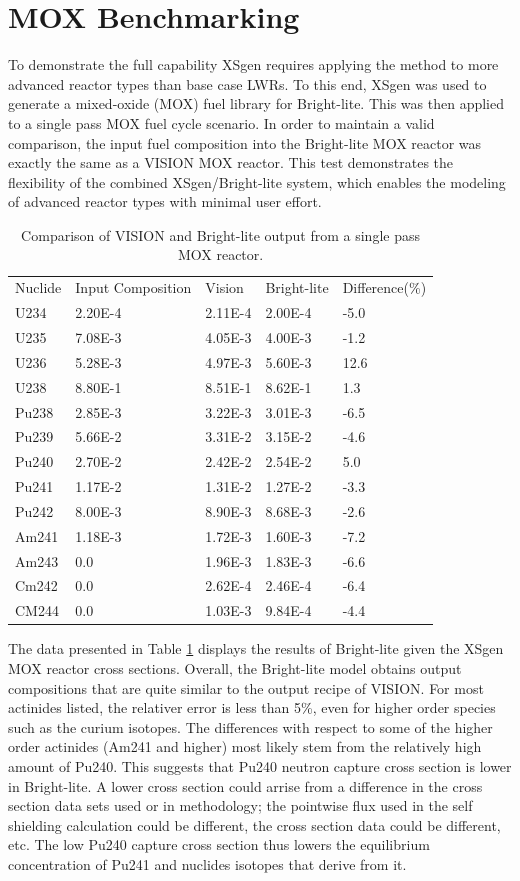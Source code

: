 \documentclass{article}
\begin{document}
\section{MOX Benchmarking}
\label{sec-mox-benchmark}
To demonstrate the full capability XSgen requires applying the method to more advanced
reactor types than base case LWRs. To this end, XSgen was used to generate a mixed-oxide (MOX)
fuel library for Bright-lite. This was then applied to a single pass MOX fuel cycle scenario.
In order to maintain a valid comparison, the input fuel composition into the Bright-lite MOX
reactor was exactly the same as a VISION MOX reactor.
This test demonstrates the flexibility of the combined XSgen/Bright-lite system, which enables
the modeling of advanced reactor types with minimal user effort.

\begin{table}[!htb]
\centering
\caption{Comparison of VISION and Bright-lite output from a single pass MOX reactor.}
\label{tab:g}
\begin{tabular}{lllll}
Nuclide & Input Composition & Vision & Bright-lite & Difference(\%) \\
U234 & 2.20E-4 & 2.11E-4 & 2.00E-4 & -5.0\\
U235 & 7.08E-3 & 4.05E-3 & 4.00E-3 & -1.2\\
U236 & 5.28E-3 & 4.97E-3 & 5.60E-3 & 12.6\\
U238 & 8.80E-1 & 8.51E-1 & 8.62E-1 & 1.3\\
Pu238 & 2.85E-3 & 3.22E-3 & 3.01E-3 & -6.5\\
Pu239 & 5.66E-2 & 3.31E-2 & 3.15E-2 & -4.6\\
Pu240 & 2.70E-2 & 2.42E-2 & 2.54E-2 & 5.0\\
Pu241 & 1.17E-2 & 1.31E-2 & 1.27E-2 & -3.3\\
Pu242 & 8.00E-3 & 8.90E-3 & 8.68E-3 & -2.6\\
Am241 & 1.18E-3 & 1.72E-3 & 1.60E-3 & -7.2\\
Am243 & 0.0 & 1.96E-3 & 1.83E-3 & -6.6\\
Cm242 & 0.0 & 2.62E-4 & 2.46E-4 & -6.4\\
CM244 & 0.0 & 1.03E-3 & 9.84E-4 & -4.4
\end{tabular}
\end{table}

The data presented in Table \ref{tab:g} displays the results of Bright-lite given the XSgen MOX
reactor cross sections. Overall, the Bright-lite model obtains output compositions that
are quite similar to the output recipe of VISION. For most actinides listed, the relativer error
is less than 5\%, even for higher order species such as the curium isotopes.
The differences with respect to some of the higher order actinides (Am241 and higher) most
likely stem from the relatively high amount of Pu240. This suggests that Pu240 neutron capture
cross section is lower in Bright-lite. A lower cross section could arrise from a difference in the cross
section data sets used or in methodology; the pointwise flux used in the self shielding calculation could
be different, the cross section data could be different, etc.
The low Pu240 capture cross section thus lowers the equilibrium concentration of Pu241 and
nuclides isotopes that derive from it.
\end{document}
